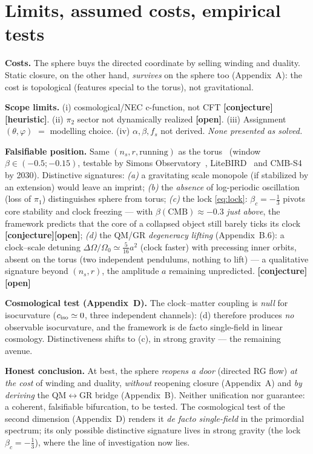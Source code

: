 \documentclass[11pt]{article}
\newcommand{\conj}{{\small\textbf{[conjecture]}}}
\newcommand{\heur}{{\small\textbf{[heuristic]}}}
\newcommand{\ouv}{{\small\textbf{[open]}}}
\theoremstyle{definition}
\begin{document}
\section{Limits, assumed costs, empirical tests}
\textbf{Costs.} The sphere buys the directed coordinate by selling winding and duality. Static closure,
on the other hand, \emph{survives} on the sphere too (Appendix~A): the cost is topological (features
special to the torus), not gravitational.

\textbf{Scope limits.} (i) cosmological/NEC c-function, not CFT \conj\heur. (ii) $\pi_2$ sector not
dynamically realized \ouv. (iii) Assignment $(\theta,\varphi)$ $=$ modelling choice. (iv)
$\alpha,\beta,f_s$ not derived. \emph{None presented as solved.}

\textbf{Falsifiable position.} Same $(n_s,r,\text{running})$ as the torus~\cite{Planck2018X,BICEPKeck2021} (window
$\beta\in(-0.5;-0.15)$, testable by Simons Observatory~\cite{SimonsObs2019}, LiteBIRD~\cite{LiteBIRD2023} and CMB-S4~\cite{CMBS4Book2016} by 2030). Distinctive signatures:
\emph{(a)} a gravitating scale monopole (if stabilized by an extension) would leave an imprint;
\emph{(b)} the \emph{absence} of log-periodic oscillation (loss of $\pi_1$) distinguishes sphere from
torus; \emph{(c)} the lock \eqref{eq:lock}: $\beta_c=-\tfrac13$ pivots core stability and clock freezing
--- with $\beta(\text{CMB})\approx-0.3$ \emph{just above}, the framework predicts that the core of a
collapsed object still barely ticks its clock \conj\ouv; \emph{(d)} the QM/GR \emph{degeneracy lifting}
(Appendix~B.6): a clock--scale detuning $\Delta\Omega/\Omega_0\simeq\tfrac{5}{16}a^2$ (clock faster) with
precessing inner orbits, absent on the torus (two independent pendulums, nothing to lift) --- a
qualitative signature beyond $(n_s,r)$, the amplitude $a$ remaining unpredicted. \conj\ouv

\textbf{Cosmological test (Appendix~D).} The clock--matter coupling is \emph{null} for isocurvature
($c_{\rm iso}\simeq0$, three independent channels): (d) therefore produces \emph{no} observable
isocurvature, and the framework is de facto single-field in linear cosmology. Distinctiveness shifts to
(c), in strong gravity --- the remaining avenue.

\textbf{Honest conclusion.} At best, the sphere \emph{reopens a door} (directed RG flow) \emph{at the
cost} of winding and duality, \emph{without} reopening closure (Appendix~A) and \emph{by deriving} the
QM$\leftrightarrow$GR bridge (Appendix~B). Neither unification nor guarantee: a coherent, falsifiable
bifurcation, to be tested. The cosmological test of the second dimension (Appendix~D) renders it
\emph{de facto single-field} in the primordial spectrum; its only possible distinctive signature lives in
strong gravity (the lock $\beta_c=-\tfrac13$), where the line of investigation now lies.
\end{document}
